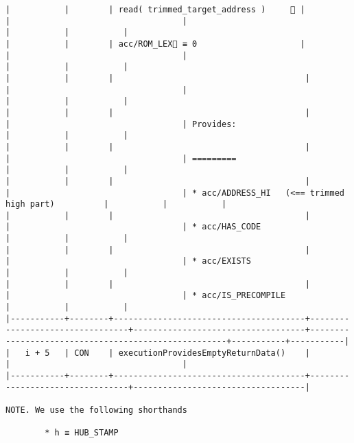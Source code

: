 \documentclass[varwidth=\maxdimen,margin=0.5cm,multi={verbatim}]{standalone}
\begin{document}
\begin{verbatim}
|           |        | read( trimmed_target_address )     👋 |                                 |                                   |                                                     |           |           |
|           |        | acc/ROM_LEX🚩 ≡ 0                     |                                 |                                   |                                                     |           |           |
|           |        |                                       |                                 |                                   |                                                     |           |           |
|           |        |                                       |                                 |                                   | Provides:                                           |           |           |
|           |        |                                       |                                 |                                   | =========                                           |           |           |
|           |        |                                       |                                 |                                   | * acc/ADDRESS_HI   (<== trimmed high part)          |           |           |
|           |        |                                       |                                 |                                   | * acc/HAS_CODE                                      |           |           |
|           |        |                                       |                                 |                                   | * acc/EXISTS                                        |           |           |
|           |        |                                       |                                 |                                   | * acc/IS_PRECOMPILE                                 |           |           |
|-----------+--------+---------------------------------------+---------------------------------+-----------------------------------+-----------------------------------------------------+-----------+-----------|
|   i + 5   | CON    | executionProvidesEmptyReturnData()    |                                 |                                   |
|-----------+--------+---------------------------------------+---------------------------------+-----------------------------------|

NOTE. We use the following shorthands

        * h ≡ HUB_STAMP

\end{verbatim}
\end{document}

